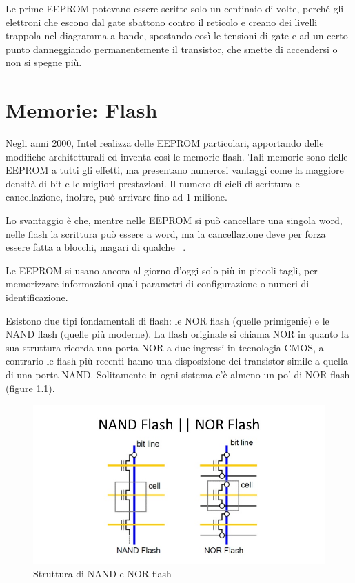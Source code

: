 \documentclass[11pt,4paper]{report}
\begin{document}
Le prime EEPROM potevano essere scritte solo un centinaio di volte, perché gli elettroni che escono dal gate sbattono contro il reticolo e creano dei livelli trappola nel diagramma a bande, spostando così le tensioni di gate e ad un certo punto danneggiando permanentemente il transistor, che smette di accendersi o non si spegne più. 

\chapter{Memorie: Flash}
Negli anni 2000, Intel realizza delle EEPROM particolari, apportando delle modifiche architetturali ed inventa così le memorie flash. Tali memorie sono delle EEPROM a tutti gli effetti, ma presentano numerosi vantaggi come la maggiore densità di bit e le migliori prestazioni. Il numero di cicli di scrittura e cancellazione, inoltre, può arrivare fino ad 1 milione.

Lo svantaggio è che, mentre nelle EEPROM si può cancellare una singola word, nelle flash la scrittura può essere a word, ma la cancellazione deve per forza essere fatta a blocchi, magari di qualche \si{\kilo\byte}. 

Le EEPROM si usano ancora al giorno d'oggi solo più in piccoli tagli, per memorizzare informazioni quali parametri di configurazione o numeri di identificazione.

Esistono due tipi fondamentali di flash: le NOR flash (quelle primigenie) e le NAND flash (quelle più moderne). La flash originale si chiama NOR in quanto la sua struttura ricorda una porta NOR a due ingressi in tecnologia CMOS, al contrario le flash più recenti hanno una disposizione dei transistor simile a quella di una porta NAND. Solitamente in ogni sistema c'è almeno un po' di NOR flash (figure \ref{fig:nand_nor}).
\begin{figure}[hbtp]
	\centering
	\includegraphics[width=0.6\linewidth]{memorie/nand_nor_flash.jpg}
	\caption{Struttura di NAND e NOR flash}
	\label{fig:nand_nor}
\end{figure}
\end{document}
